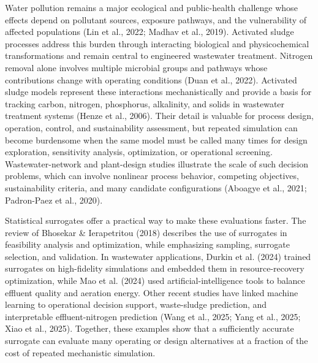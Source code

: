 \documentclass[a4paper,fleqn]{cas-sc}
\begin{document}
Water pollution remains a major ecological and public-health challenge whose effects depend on pollutant sources, exposure pathways, and the vulnerability of affected populations (Lin et al., 2022; Madhav et al., 2019). Activated sludge processes address this burden through interacting biological and physicochemical transformations and remain central to engineered wastewater treatment. Nitrogen removal alone involves multiple microbial groups and pathways whose contributions change with operating conditions (Duan et al., 2022). Activated sludge models represent these interactions mechanistically and provide a basis for tracking carbon, nitrogen, phosphorus, alkalinity, and solids in wastewater treatment systems (Henze et al., 2006). Their detail is valuable for process design, operation, control, and sustainability assessment, but repeated simulation can become burdensome when the same model must be called many times for design exploration, sensitivity analysis, optimization, or operational screening. Wastewater-network and plant-design studies illustrate the scale of such decision problems, which can involve nonlinear process behavior, competing objectives, sustainability criteria, and many candidate configurations (Aboagye et al., 2021; Padron-Paez et al., 2020).

Statistical surrogates offer a practical way to make these evaluations faster. The review of Bhosekar \& Ierapetritou (2018) describes the use of surrogates in feasibility analysis and optimization, while emphasizing sampling, surrogate selection, and validation. In wastewater applications, Durkin et al. (2024) trained surrogates on high-fidelity simulations and embedded them in resource-recovery optimization, while Mao et al. (2024) used artificial-intelligence tools to balance effluent quality and aeration energy. Other recent studies have linked machine learning to operational decision support, waste-sludge prediction, and interpretable effluent-nitrogen prediction (Wang et al., 2025; Yang et al., 2025; Xiao et al., 2025). Together, these examples show that a sufficiently accurate surrogate can evaluate many operating or design alternatives at a fraction of the cost of repeated mechanistic simulation.
\end{document}
